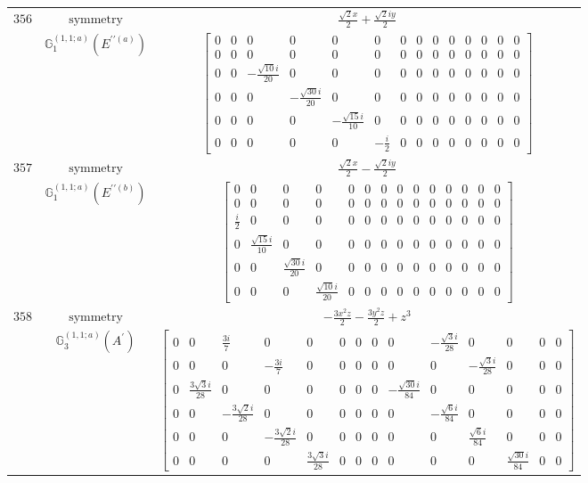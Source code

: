 \documentclass[fleqn,8pt,landscape]{jsarticle}
\begin{document}
\begin{longtable}{ccc}
$ 356 $ & $ \text{symmetry} $ & $ \frac{\sqrt{2} x}{2} + \frac{\sqrt{2} i y}{2} $ \\
$  $ & $ \mathbb{G}_{1}^{(1,1;a)}(E^{\prime\prime(a)}) $ & $ \begin{bmatrix} 0 & 0 & 0 & 0 & 0 & 0 & 0 & 0 & 0 & 0 & 0 & 0 & 0 & 0 \\ 0 & 0 & 0 & 0 & 0 & 0 & 0 & 0 & 0 & 0 & 0 & 0 & 0 & 0 \\ 0 & 0 & - \frac{\sqrt{10} i}{20} & 0 & 0 & 0 & 0 & 0 & 0 & 0 & 0 & 0 & 0 & 0 \\ 0 & 0 & 0 & - \frac{\sqrt{30} i}{20} & 0 & 0 & 0 & 0 & 0 & 0 & 0 & 0 & 0 & 0 \\ 0 & 0 & 0 & 0 & - \frac{\sqrt{15} i}{10} & 0 & 0 & 0 & 0 & 0 & 0 & 0 & 0 & 0 \\ 0 & 0 & 0 & 0 & 0 & - \frac{i}{2} & 0 & 0 & 0 & 0 & 0 & 0 & 0 & 0 \end{bmatrix} $ \\ \hline
$ 357 $ & $ \text{symmetry} $ & $ \frac{\sqrt{2} x}{2} - \frac{\sqrt{2} i y}{2} $ \\
$  $ & $ \mathbb{G}_{1}^{(1,1;a)}(E^{\prime\prime(b)}) $ & $ \begin{bmatrix} 0 & 0 & 0 & 0 & 0 & 0 & 0 & 0 & 0 & 0 & 0 & 0 & 0 & 0 \\ 0 & 0 & 0 & 0 & 0 & 0 & 0 & 0 & 0 & 0 & 0 & 0 & 0 & 0 \\ \frac{i}{2} & 0 & 0 & 0 & 0 & 0 & 0 & 0 & 0 & 0 & 0 & 0 & 0 & 0 \\ 0 & \frac{\sqrt{15} i}{10} & 0 & 0 & 0 & 0 & 0 & 0 & 0 & 0 & 0 & 0 & 0 & 0 \\ 0 & 0 & \frac{\sqrt{30} i}{20} & 0 & 0 & 0 & 0 & 0 & 0 & 0 & 0 & 0 & 0 & 0 \\ 0 & 0 & 0 & \frac{\sqrt{10} i}{20} & 0 & 0 & 0 & 0 & 0 & 0 & 0 & 0 & 0 & 0 \end{bmatrix} $ \\ \hline
$ 358 $ & $ \text{symmetry} $ & $ - \frac{3 x^{2} z}{2} - \frac{3 y^{2} z}{2} + z^{3} $ \\
$  $ & $ \mathbb{G}_{3}^{(1,1;a)}(A^{\prime}) $ & $ \begin{bmatrix} 0 & 0 & \frac{3 i}{7} & 0 & 0 & 0 & 0 & 0 & 0 & - \frac{\sqrt{3} i}{28} & 0 & 0 & 0 & 0 \\ 0 & 0 & 0 & - \frac{3 i}{7} & 0 & 0 & 0 & 0 & 0 & 0 & - \frac{\sqrt{3} i}{28} & 0 & 0 & 0 \\ 0 & \frac{3 \sqrt{3} i}{28} & 0 & 0 & 0 & 0 & 0 & 0 & - \frac{\sqrt{30} i}{84} & 0 & 0 & 0 & 0 & 0 \\ 0 & 0 & - \frac{3 \sqrt{2} i}{28} & 0 & 0 & 0 & 0 & 0 & 0 & - \frac{\sqrt{6} i}{84} & 0 & 0 & 0 & 0 \\ 0 & 0 & 0 & - \frac{3 \sqrt{2} i}{28} & 0 & 0 & 0 & 0 & 0 & 0 & \frac{\sqrt{6} i}{84} & 0 & 0 & 0 \\ 0 & 0 & 0 & 0 & \frac{3 \sqrt{3} i}{28} & 0 & 0 & 0 & 0 & 0 & 0 & \frac{\sqrt{30} i}{84} & 0 & 0 \end{bmatrix} $ \\ \hline

\end{longtable}
\end{document}
